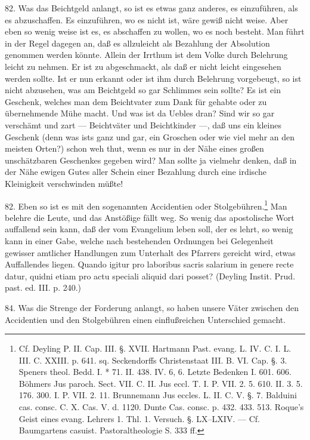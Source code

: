 82. Was das Beichtgeld anlangt, so ist es etwas ganz anderes, es einzuführen, als es abzuschaffen. Es einzuführen, wo es nicht ist, wäre gewiß nicht weise. Aber eben so wenig weise ist es, es abschaffen zu wollen, wo es noch besteht. Man führt in der Regel dagegen an, daß es allzuleicht als Bezahlung der Absolution genommen werden könnte. Allein der Irrthum ist dem Volke durch Belehrung leicht zu nehmen. Er ist zu abgeschmackt, als daß er nicht leicht eingesehen werden sollte. Ist er nun erkannt oder ist ihm durch Belehrung vorgebeugt, so ist nicht abzusehen, was am Beichtgeld so gar Schlimmes sein sollte? Es ist ein Geschenk, welches man dem Beichtvater zum Dank für gehabte oder zu übernehmende Mühe macht. Und was ist da Uebles dran? Sind wir so gar verschämt und zart — Beichtväter und Beichtkinder —, daß uns ein kleines Geschenk (denn was ists ganz und gar, ein Groschen oder wie viel mehr an den meisten Orten?) schon weh thut, wenn es nur in der Nähe
eines großen unschätzbaren Geschenkes gegeben wird? Man sollte ja vielmehr denken, daß in der Nähe ewigen Gutes aller Schein einer Bezahlung durch eine irdische Kleinigkeit verschwinden müßte!

82. Eben so ist es mit den sogenannten Accidentien oder Stolgebühren.\footnote{Cf. Deyling P. II. Cap. III. §. XVII. Hartmann Past. evang. L. IV. C. I. L. III. C. XXIII. p. 641. sq. Seckendorffs Christenstaat III. B. VI. Cap. §. 3. Speners theol. Bedd. I. * 71. II. 438. IV. 6, 6. Letzte Bedenken I. 601. 606. Böhmers Jus paroch. Sect. VII. C. II. Jus eccl. T. I. P. VII. 2. 5. 610. II. 3. 5. 176. 300. I. P. VII. 2. 11. Brunnemann Jus eccles. L. II. C. V. §. 7. Balduini cas. consc. C. X. Cas. V. d. 1120. Dunte Cas. consc. p. 432. 433. 513. Roque’s Geist eines evang. Lehrers 1. Thl. 1. Versuch. §. LX–LXIV. — Cf. Baumgartens casuist. Pastoraltheologie S. 333 ff.} Man belehre die Leute, und das Anstößige fällt weg. So wenig das apostolische Wort auffallend sein kann, daß der vom Evangelium leben soll, der es lehrt, so wenig kann in einer Gabe, welche nach bestehenden Ordnungen bei Gelegenheit gewisser amtlicher Handlungen zum Unterhalt des Pfarrers gereicht wird, etwas Auffallendes liegen. Quando igitur pro laboribus sacris salarium in genere recte datur, quidni etiam pro actu speciali aliquid dari posset? (Deyling Instit. Prud. past. ed. III. p. 240.)

84. Was die Strenge der Forderung anlangt, so haben unsere Väter zwischen den Accidentien und den Stolgebühren einen einflußreichen Unterschied gemacht.

